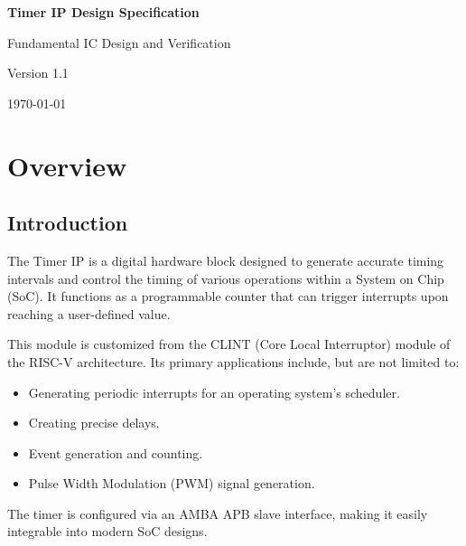 \documentclass[11pt, a4paper]{article}
\begin{document}
\begin{titlepage}
    \centering
    \vspace*{1cm}
    
    {\Huge \bfseries Timer IP Design Specification}
    
    \vspace{1.5cm}
    
    {\Large Fundamental IC Design and Verification}
    
    \vspace{2cm}
    
    \vfill
    
    \vspace{1cm}
    
    {\large Version 1.1}
    
    \vspace{0.5cm}
    
    {\large \today}
    
\end{titlepage}

\newpage

\tableofcontents
\newpage
\listoffigures
\listoftables
\newpage

\section{Overview}

\subsection{Introduction}
The Timer IP is a digital hardware block designed to generate accurate timing intervals and control the timing of various operations within a System on Chip (SoC). It functions as a programmable counter that can trigger interrupts upon reaching a user-defined value.

This module is customized from the CLINT (Core Local Interruptor) module of the RISC-V architecture. Its primary applications include, but are not limited to:
\begin{itemize}
    \item Generating periodic interrupts for an operating system's scheduler.
    \item Creating precise delays.
    \item Event generation and counting.
    \item Pulse Width Modulation (PWM) signal generation.
\end{itemize}
The timer is configured via an AMBA APB slave interface, making it easily integrable into modern SoC designs.
\end{document}
